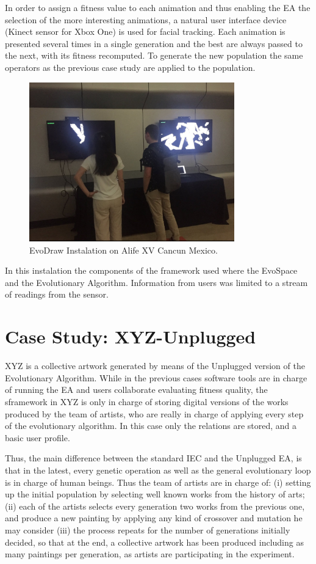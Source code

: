 In order to assign a fitness value to each animation and thus enabling the EA the selection of the more interesting animations, a natural user interface device (Kinect sensor for Xbox One)
is used for facial tracking. Each animation is 
presented several times in a single generation and the best are always passed to the next, 
with its fitness recomputed. To generate the new population the same operators as the previous case study
are applied to the population. 

\begin{figure}[!t]
    \centering
        \includegraphics[width=3.5in]{img/kinect.png}
    \caption{EvoDraw Instalation on Alife XV Cancun Mexico.}
    \label{fig:kinect}
\end{figure}

In this instalation the components of the framework used where the EvoSpace and the Evolutionary Algorithm.
Information from users was limited to a stream of readings from the sensor.

\section{Case Study: XYZ-Unplugged}

XYZ is a collective artwork generated by means of the Unplugged version of the Evolutionary Algorithm.
While in the previous cases software tools are in charge of running the EA and users collaborate evaluating
fitness quality, the sframework in XYZ is only in charge of storing digital versions of the works produced 
by the team of artists, who are really in charge of applying every step of the evolutionary algorithm. In 
this case only the relations are stored, and a basic user profile. 

Thus, the main difference between the standard IEC and the Unplugged EA, is that in the latest,
every genetic operation as well as the general evolutionary loop is in charge of human beings. 
Thus the team of artists are in charge of:  (i) setting up the initial population by selecting
well known works from the history of arts;  (ii) each of the artists selects every generation two works 
from the previous one, and produce a new painting by applying any kind of crossover and mutation he may consider 
(iii) the process repeats for the number of generations initially decided, so that at the end, a collective 
artwork has been produced including as many paintings per generation, as artists are participating in the experiment.  


